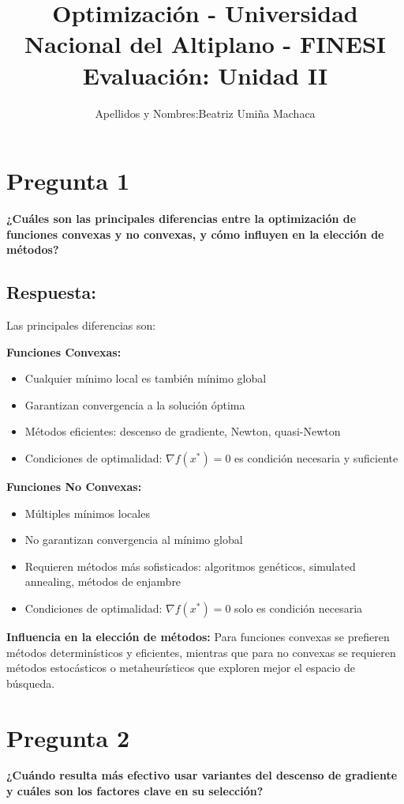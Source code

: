 \documentclass[12pt]{article}
\title{Optimización - Universidad Nacional del Altiplano - FINESI\\
Evaluación: Unidad II}
\author{Apellidos y Nombres:Beatriz Umiña Machaca}
\date{}
\begin{document}
\maketitle

\section*{Pregunta 1}
\textbf{¿Cuáles son las principales diferencias entre la optimización de funciones convexas y no convexas, y cómo influyen en la elección de métodos?}\\


\subsection*{Respuesta:}
Las principales  diferencias son:

\textbf{Funciones Convexas:}
\begin{itemize}
    \item Cualquier mínimo local es también mínimo global
    \item Garantizan convergencia a la solución óptima
    \item Métodos eficientes: descenso de gradiente, Newton, quasi-Newton
    \item Condiciones de optimalidad: $\nabla f(x^*) = 0$ es condición necesaria y suficiente
\end{itemize}

\textbf{Funciones No Convexas:}
\begin{itemize}
    \item Múltiples mínimos locales
    \item No garantizan convergencia al mínimo global
    \item Requieren métodos más sofisticados: algoritmos genéticos, simulated annealing, métodos de enjambre
    \item Condiciones de optimalidad: $\nabla f(x^*) = 0$ solo es condición necesaria
\end{itemize}

\textbf{Influencia en la elección de métodos:}
Para funciones convexas se prefieren métodos determinísticos y eficientes, mientras que para no convexas se requieren métodos estocásticos o metaheurísticos que exploren mejor el espacio de búsqueda.

\section*{Pregunta 2}
\textbf{¿Cuándo resulta más efectivo usar variantes del descenso de gradiente y cuáles son los factores clave en su selección?}
\end{document}
